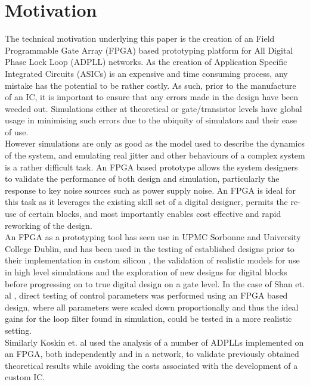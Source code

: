 \documentclass[conference]{IEEEtran}
\begin{document}
\section{Motivation}
The technical motivation underlying this paper is the creation of an Field Programmable Gate Array (FPGA) based prototyping platform for All Digital Phase Lock Loop (ADPLL) networks. As the creation of Application Specific Integrated Circuits (ASICs) is an expensive and time consuming process, any mistake has the potential to be rather costly. As such, prior to the manufacture of an IC, it is important to ensure that any errors made in the design have been weeded out.
Simulations either at theoretical or gate/transistor levels have global usage in minimising such errors due to the ubiquity of simulators and their ease of use.\\
However simulations are only as good as the model used to describe the dynamics of the system, and emulating real jitter and other behaviours of a complex system is a rather difficult task. %
An FPGA based prototype allows the system designers to validate the performance of both design and simulation, particularly the response to key noise sources such as power supply noise. An FPGA is ideal for this task as it leverages the existing skill set of a digital designer, permits the re-use of certain blocks, and most importantly enables cost effective and rapid reworking of the design.\\
An FPGA as a prototyping tool has seen use in UPMC Sorbonne and University College Dublin, and has been used in the testing of established designs prior to their implementation in custom silicon \cite{zianbetov2013phd,shan2014phd}, the validation of realistic models for use in high level simulations\cite{theboys2019} and the exploration of new designs for digital blocks before progressing on to true digital design on a gate level.  %
In the case of Shan et. al \cite{shan2014phd}, direct testing of control parameters was performed using an FPGA based design, where all parameters were scaled down proportionally and thus the ideal gains for the loop filter found in simulation, could be tested in a more realistic setting.\\
Similarly Koskin et. al \cite{theboys2019} used the analysis of a number of ADPLLs implemented on an FPGA, both independently and in a network, to validate previously obtained theoretical results while avoiding the costs associated with the development of a custom IC.\\
\end{document}
